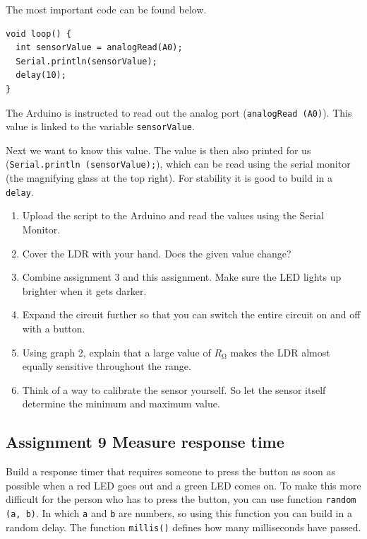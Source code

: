 \documentclass{arduino}
\begin{document}
The most important code can be found below.

\begin{lstlisting}
void loop() {
  int sensorValue = analogRead(A0);
  Serial.println(sensorValue);
  delay(10);
}
\end{lstlisting}

The Arduino is instructed to read out the analog port (\lstinline{analogRead (A0)}). This value is linked to the variable \lstinline{sensorValue}. 

Next we want to know this value. The value is then also printed for us (\lstinline{Serial.println (sensorValue);}), which can be read using the serial monitor (the magnifying glass at the top right). For stability it is good to build in a \lstinline{delay}.

\begin{enumerate}[label={\alph*})]
\item Upload the script to the Arduino and read the values ​​using the Serial Monitor.

\item Cover the LDR with your hand. Does the given value change?

\item Combine assignment 3 and this assignment. Make sure the LED lights up brighter when it gets darker.

\item Expand the circuit further so that you can switch the entire circuit on and off with a button.

\item Using graph 2, explain that a large value of $ R_{\si{\ohm}} $ makes the LDR almost equally sensitive throughout the range.

\item Think of a way to calibrate the sensor yourself. So let the sensor itself determine the minimum and maximum value.
\end{enumerate}


\subsection{Assignment 9 Measure response time}

Build a response timer that requires someone to press the button as soon as possible when a red LED goes out and a green LED comes on. To make this more difficult for the person who has to press the button, you can use function \lstinline{random (a, b)}. In which \lstinline{a} and \lstinline{b} are numbers, so using this function you can build in a random delay. The function \lstinline{millis()} defines how many milliseconds have passed.
\end{document}
